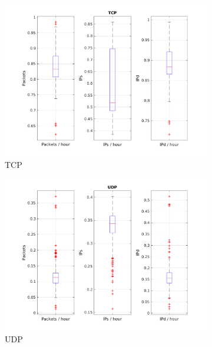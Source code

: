 \documentclass{article}
\begin{document}
\begin{figure}[h]
    \begin{subfigure}{.5\textwidth}
        \centering
        \includegraphics[width=\textwidth]{../exercise-3/plots/rep_17_TCP}
        \caption{TCP}
    \end{subfigure}
    \begin{subfigure}{.5\textwidth}
        \centering
        \includegraphics[width=\textwidth]{../exercise-3/plots/rep_17_UDP}
        \caption{UDP}
    \end{subfigure}
    \begin{subfigure}{.5\textwidth}
        \centering

\end{subfigure}
\end{figure}
\end{document}
